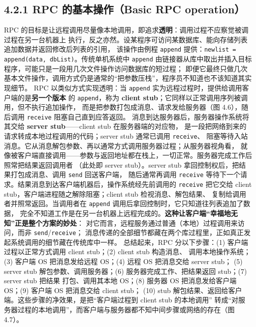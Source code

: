 \subsection*{4.2.1 RPC 的基本操作（Basic RPC operation）}
RPC 的目标是让远程调用尽量像本地调用，即追求\textbf{透明}：调用过程不应察觉被调过程在另一台机器上
执行，反之亦然。设某程序可访问某数据库、能向存储列表追加数据并返回修改后列表的引用，
该操作由例程 \texttt{append} 提供：\texttt{newlist = append(data, dbList)}。传统单机系统中
\texttt{append} 由链接器从库中取出并插入目标程序，可能只是一段用几次文件操作访问数据库的短过程；
即便它最终只做几次基本文件操作，调用方式仍是通常的“把参数压栈”，程序员不知道也不该知道其实现细节。
RPC 以类似方式实现透明：当 \texttt{append} 实为远程过程时，提供给调用客户端的是\textbf{另一个版本}
的 \texttt{append}，称为 \textbf{client stub}；它同样以正常调用序列被调用，但不执行追加操作，
而是把参数打包成消息、请求发给服务器（图 4.6），随后调用 \texttt{receive} 阻塞自己直到应答返回。
消息到达服务器后，服务器操作系统将其交给 \textbf{server stub}——client stub 在服务器端的对应物，
是一段把网络到来的请求转成本地过程调用的代码；server stub 通常已调用 \texttt{receive}、
阻塞等待入站消息。它从消息解包参数、再以通常方式调用服务器过程；从服务器视角看，
就像被客户端直接调用——参数与返回地址都在栈上，一切正常。服务器完成工作后照常把结果返回调用者
（此处即 server stub）。server stub 拿回控制权后，把结果打包成消息、调用 \texttt{send} 回送客户端，
随后通常再调用 \texttt{receive} 等待下一个请求。结果消息到达客户端机器后，操作系统经先前调用的
\texttt{receive} 把它交给 client stub，客户端进程随之解除阻塞；client stub 检视消息、解包结果、
复制给调用者并照常返回。当调用者在 \texttt{append} 调用后拿回控制时，它只知道往列表追加了数据，
完全不知道工作是在另一台机器上远程完成的。\textbf{这种让客户端“幸福地无知”正是整个方案的妙处}：
对它而言，远程服务通过普通（本地）过程调用来访问，而非 \texttt{send}/\texttt{receive}；
消息传递的全部细节都藏在两个库过程里，正如真正发起系统调用的细节藏在传统库中一样。
总结起来，RPC 分以下步骤：(1) 客户端过程以正常方式调用 client stub；(2) client stub 构造消息、
调用本地操作系统；(3) 客户端 OS 把消息发给远程 OS；(4) 远程 OS 把消息交给 server stub；
(5) server stub 解包参数、调用服务器；(6) 服务器完成工作、把结果返回 stub；(7) server stub 把结果
打包、调用其本地 OS；(8) 服务器 OS 把消息发给客户端 OS；(9) 客户端 OS 把消息交给 client stub；
(10) stub 解包结果、返回给客户端。这些步骤的净效果，是把“客户端过程到 client stub 的本地调用”
转成“对服务器过程的本地调用”，而客户端与服务器都不知中间步骤或网络的存在（图 4.7）。

